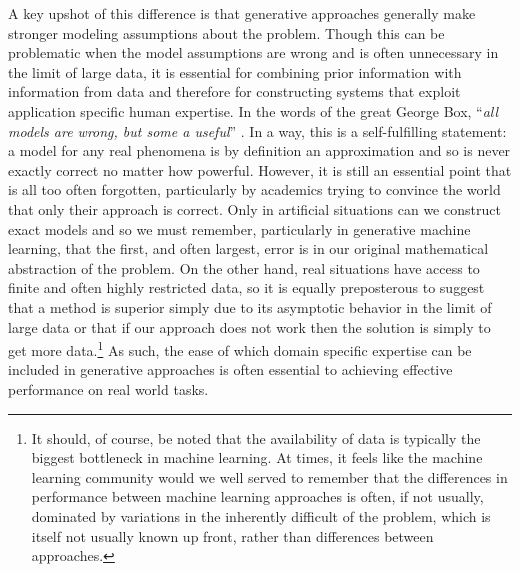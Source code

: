 A key upshot of this difference
is that generative approaches generally make stronger modeling assumptions about the problem.  Though
this can be problematic when the model assumptions are wrong and is often unnecessary in
the limit of large data, it is essential for combining prior information with information from data
and therefore for constructing systems that exploit application specific human expertise.
In the words of the great George Box, ``\textit{all models are wrong, but some a useful}''
\citep{box1979robustness,box2005statistics}.  In a way, this is a self-fulfilling statement: a model for
any real phenomena
is by definition an approximation and so is never exactly correct no matter how powerful.  However,
it is still an essential point that is all too often forgotten, particularly by academics trying to convince
the world that only their approach is correct.  Only in artificial situations can we construct exact models
and so we must remember, particularly in generative machine learning, that the first, and often largest,
error is in our original mathematical abstraction of the problem.  On the other hand, real situations
have access to finite and often highly restricted data, so it is equally preposterous to suggest that a
method is superior simply due to its asymptotic behavior in the limit of large data or that if our approach
does not work then the solution is simply to get more data.\footnote{It should, of course, be noted
	that the availability of data is typically the biggest bottleneck in machine learning.  At times, it feels 
	like the machine learning community would we well served to remember that the differences in performance between
	machine learning approaches is often, if not usually, dominated by variations in the inherently difficult of the
	problem, which is itself not usually known up front, rather than differences between approaches.}  As such, the ease of which domain specific
expertise can be included in generative approaches is often essential to achieving effective performance
on real world tasks.

